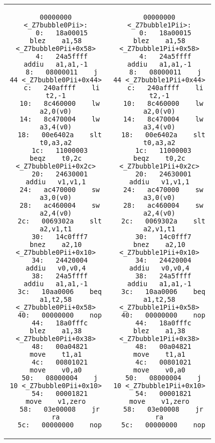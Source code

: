 \begin{figure}
\begin{center}
\begin{tabular}{c c}
	\begin{minipage}[t]{.5\textwidth}
		\begin{lstlisting}[caption=bubble0,basicstyle=\ttfamily\scriptsize, tabsize=2]
00000000 <_Z7bubble0Pii>:
   0:	18a00015 	blez	a1,58 <_Z7bubble0Pii+0x58>
   4:	24a5ffff 	addiu	a1,a1,-1
   8:	08000011 	j	44 <_Z7bubble0Pii+0x44>
   c:	240affff 	li	t2,-1
  10:	8c460000 	lw	a2,0(v0)
  14:	8c470004 	lw	a3,4(v0)
  18:	00e6402a 	slt	t0,a3,a2
  1c:	11000003 	beqz	t0,2c <_Z7bubble0Pii+0x2c>
  20:	24630001 	addiu	v1,v1,1
  24:	ac470000 	sw	a3,0(v0)
  28:	ac460004 	sw	a2,4(v0)
  2c:	0069302a 	slt	a2,v1,t1
  30:	14c0fff7 	bnez	a2,10 <_Z7bubble0Pii+0x10>
  34:	24420004 	addiu	v0,v0,4
  38:	24a5ffff 	addiu	a1,a1,-1
  3c:	10aa0006 	beq	a1,t2,58 <_Z7bubble0Pii+0x58>
  40:	00000000 	nop
  44:	18a0fffc 	blez	a1,38 <_Z7bubble0Pii+0x38>
  48:	00a04821 	move	t1,a1
  4c:	00801021 	move	v0,a0
  50:	08000004 	j	10 <_Z7bubble0Pii+0x10>
  54:	00001821 	move	v1,zero
  58:	03e00008 	jr	ra
  5c:	00000000 	nop
		\end{lstlisting}
	\end{minipage} 
	&
	\begin{minipage}[t]{.5\textwidth}
		\begin{lstlisting}[caption=bubble1, basicstyle=\ttfamily\scriptsize, tabsize=2]
00000000 <_Z7bubble1Pii>:
   0:	18a00015 	blez	a1,58 <_Z7bubble1Pii+0x58>
   4:	24a5ffff 	addiu	a1,a1,-1
   8:	08000011 	j	44 <_Z7bubble1Pii+0x44>
   c:	240affff 	li	t2,-1
  10:	8c460000 	lw	a2,0(v0)
  14:	8c470004 	lw	a3,4(v0)
  18:	00e6402a 	slt	t0,a3,a2
  1c:	11000003 	beqz	t0,2c <_Z7bubble1Pii+0x2c>
  20:	24630001 	addiu	v1,v1,1
  24:	ac470000 	sw	a3,0(v0)
  28:	ac460004 	sw	a2,4(v0)
  2c:	0069302a 	slt	a2,v1,t1
  30:	14c0fff7 	bnez	a2,10 <_Z7bubble1Pii+0x10>
  34:	24420004 	addiu	v0,v0,4
  38:	24a5ffff 	addiu	a1,a1,-1
  3c:	10aa0006 	beq	a1,t2,58 <_Z7bubble1Pii+0x58>
  40:	00000000 	nop
  44:	18a0fffc 	blez	a1,38 <_Z7bubble1Pii+0x38>
  48:	00a04821 	move	t1,a1
  4c:	00801021 	move	v0,a0
  50:	08000004 	j	10 <_Z7bubble1Pii+0x10>
  54:	00001821 	move	v1,zero
  58:	03e00008 	jr	ra
  5c:	00000000 	nop
		\end{lstlisting}
	\end{minipage} \\


\end{tabular}
\end{center}
\end{figure}
